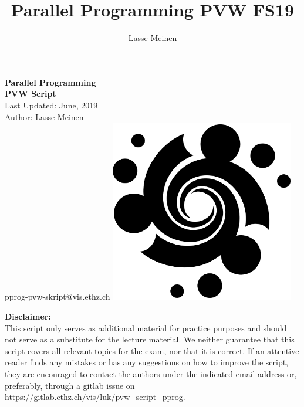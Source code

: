 \documentclass[titlepage, dvipsnames]{article}
\title{Parallel Programming PVW FS19}
\author{Lasse Meinen}
\theoremstyle{plain}
\theoremstyle{remark}
\theoremstyle{definition}
\begin{document}
    \renewcommand{\figurename}{Fig.}
    \renewcommand{\contentsname}{Table of Contents}
    \renewcommand{\thesubfigure}{\roman{subfigure}}
    
    \renewcommand{\ExerciseHeaderTitle}{\ExerciseTitle}
    \renewcommand{\ExerciseHeader}{\centerline{\textbf{\large\ExerciseName\ExerciseHeaderNB\ExerciseHeaderTitle\ExerciseHeaderOrigin}}\\}
    \renewcommand{\ExerciseListHeader}{\ExerciseHeaderDifficulty%
    \textbf{\ExerciseHeaderNB .%
    \ \ExerciseHeaderTitle \newline}%
    \ExerciseHeaderOrigin\ignorespaces}
    \renewcommand{\AnswerListHeader}{\textbf{\ExerciseHeaderNB. \ \ExerciseHeaderTitle}}
    \setlength{\Exesep}{1\baselineskip}    
    \setlength{\QuestionBefore}{.2em}
    \setlength{\QuestionIndent}{2em}
    
    \makeatletter 
        \begin{titlepage}
		\begin{center}
		\huge \textbf{Parallel Programming \\ PVW Script}
		\\ \bigskip
		\Large Last Updated: June, 2019
		\\ \bigskip
		\large Author: Lasse Meinen
		\\ \bigskip
		\Large pprog-pvw-skript@vis.ethz.ch
		\vfill
		{\includegraphics[width = 0.6\textwidth]{images/spirale_black1000x1000.png}}
		\vfill
		\end{center}

		\noindent \textbf{Disclaimer:}\\
		This  script only serves as additional material for practice purposes and should not serve as a substitute for the lecture material. We neither guarantee that this script covers all relevant topics for the exam, nor that it is correct. If an attentive reader finds any mistakes or has any suggestions on how to improve the script, they are encouraged to contact the authors under the
		indicated email address or, preferably, through a gitlab issue on https://gitlab.ethz.ch/vis/luk/pvw\_script\_pprog.
	\end{titlepage}
    \makeatother
    \thispagestyle{empty}
    \newpage

    \setcounter{page}{1} %
    
    \tableofcontents
    \newpage
    
    \newpage
    
    \newpage
    
    \newpage
    
    \newpage
\end{document}
